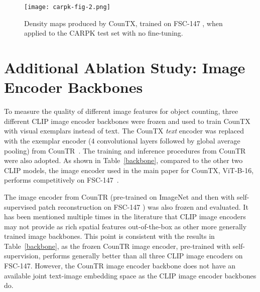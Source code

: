 \documentclass{bmvc2k}
\begin{document}
\begin{figure*}[h!]
\begin{center}
\texttt{[image: carpk-fig-2.png]}
\end{center}
   \caption{Density maps produced by CounTX, trained on FSC-147 \cite{m_Ranjan-etal-CVPR21}, when applied to the CARPK \cite{retina-net} test set with no fine-tuning.}
\label{fig:carpk}
\end{figure*}

\newpage \section{Additional Ablation Study: Image Encoder Backbones}
\label{sec:image_encoder_backbones}

To measure the quality of different image features for object counting, three different CLIP image encoder backbones were frozen and used to train CounTX with visual exemplars instead of text. The CounTX {\em text} encoder was replaced with the exemplar encoder (4 convolutional layers followed by global average pooling) from CounTR~\cite{Liu2022CounTRTG}. The training and inference procedures from CounTR were also adopted. As shown in Table~\ref{backbone}, compared to the other two CLIP models, the image encoder used in the main paper for CounTX, ViT-B-16, performs competitively on FSC-147~\cite{m_Ranjan-etal-CVPR21}. 

The image encoder from CounTR \cite{Liu2022CounTRTG} (pre-trained on ImageNet and then with self-supervised patch reconstruction on FSC-147 \cite{m_Ranjan-etal-CVPR21}) was also frozen and evaluated. It has been mentioned multiple times in the literature \cite{lit, oquab2023dinov2} that CLIP image encoders may not provide as rich spatial features out-of-the-box as other more generally trained image backbones. This point is consistent with the results in Table~\ref{backbone}, as the frozen CounTR image encoder, pre-trained with self-supervision, performs generally better than all three CLIP image encoders on FSC-147. However, the CounTR image encoder backbone does not have an available joint text-image embedding space as the CLIP image encoder backbones do. 
\end{document}
